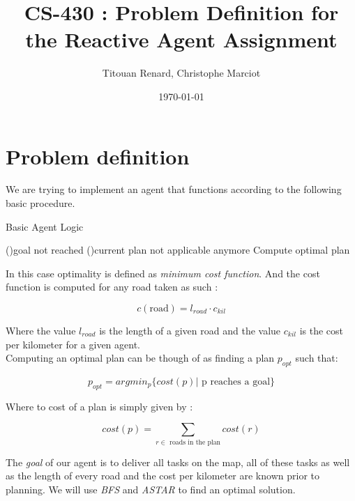 \documentclass[11pt]{article}
\title{CS-430 : Problem Definition for the Reactive Agent Assignment}
\date{\today}
\author{Titouan Renard, Christophe Marciot}
\begin{document}
\maketitle	

\section{Problem definition}

We are trying to implement an agent that functions according to the following basic procedure.

\begin{algorithm}
    \SetAlgoLined
    \caption{Basic Agent Logic}
    \While(){goal not reached}{
        \If(){current plan not applicable anymore}{
            Compute optimal plan
        }
    }
\end{algorithm}

In this case optimality is defined as \emph{minimum cost function}. And the cost function is computed for any road taken as such :

\[c(\text{road}) = l_{road} \cdot c_{kil}\]

Where the value $l_{road}$ is the length of a given road and the value $c_{kil}$ is the cost per kilometer for a given agent. \\

Computing an optimal plan can be though of as finding a plan $p_{opt}$ such that:

\[p_{opt} = argmin_{p} \{ cost(p) | \text{ p reaches a goal} \}\]

Where to cost of a plan is simply given by :

\[cost(p) = \sum_{r \in \text{ roads in the plan}} cost(r)\]

The \emph{goal} of our agent is to deliver all tasks on the map, all of these tasks as well as the length of every road and the cost per kilometer are known prior to planning. We will use \emph{BFS} and \emph{ASTAR} to find an optimal solution.
\end{document}
